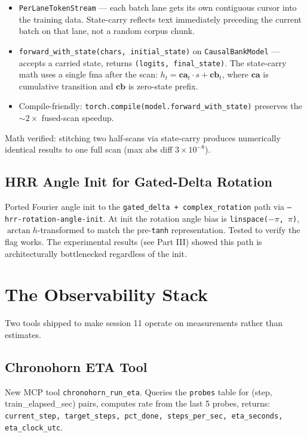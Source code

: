 \documentclass[11pt,a4paper]{report}
\begin{document}
\begin{itemize}[nosep]
\item \texttt{PerLaneTokenStream} --- each batch lane gets its own contiguous cursor into the training data. State-carry reflects text immediately preceding the current batch on that lane, not a random corpus chunk.
\item \texttt{forward\_with\_state(chars, initial\_state)} on \texttt{CausalBankModel} --- accepts a carried state, returns \texttt{(logits, final\_state)}. The state-carry math uses a single fma after the scan: $h_t = \mathbf{ca}_t \cdot s + \mathbf{cb}_t$, where $\mathbf{ca}$ is cumulative transition and $\mathbf{cb}$ is zero-state prefix.
\item Compile-friendly: \texttt{torch.compile(model.forward\_with\_state)} preserves the $\sim 2\times$ fused-scan speedup.
\end{itemize}

Math verified: stitching two half-scans via state-carry produces numerically identical results to one full scan (max abs diff $3 \times 10^{-8}$).

\section{HRR Angle Init for Gated-Delta Rotation}

Ported Fourier angle init to the \texttt{gated\_delta + complex\_rotation} path via \texttt{--hrr-rotation-angle-init}. At init the rotation angle bias is \texttt{linspace($-\pi$, $\pi$)}, $\arctan h$-transformed to match the pre-\texttt{tanh} representation. Tested to verify the flag works. The experimental results (see Part III) showed this path is architecturally bottlenecked regardless of the init.


\chapter{The Observability Stack}

Two tools shipped to make session 11 operate on measurements rather than estimates.

\section{Chronohorn ETA Tool}

New MCP tool \texttt{chronohorn\_run\_eta}. Queries the \texttt{probes} table for (step, train\_elapsed\_sec) pairs, computes rate from the last 5 probes, returns: \texttt{current\_step, target\_steps, pct\_done, steps\_per\_sec, eta\_seconds, eta\_clock\_utc}.
\end{document}
